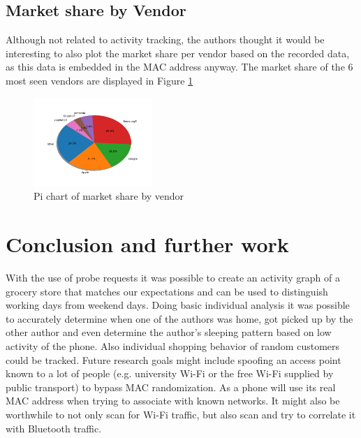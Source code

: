 \documentclass[conference,compsoc]{IEEEtran}
\begin{document}
\subsection{Market share by Vendor}
Although not related to activity tracking, the authors thought it would be interesting to also plot the market share per vendor based on the recorded data, as this data is embedded in the MAC address anyway. The market share of the 6 most seen vendors are displayed in Figure \ref{fig:piechart}

\begin{figure}[h!]
    \centering
    \includegraphics[width=0.4\textwidth]{img/piechard.png} 
    \caption{Pi chart of market share by vendor}
    \label{fig:piechart}
\end{figure}


\section{Conclusion and further work}
With the use of probe requests it was possible to create an activity graph of a grocery store that matches our expectations and can be used to distinguish working days from weekend days. Doing basic individual analysis it was possible to accurately determine when one of the authors was home, got picked up by the other author and even determine the author's sleeping pattern based on low activity of the phone. Also individual shopping behavior of random customers could be tracked.
Future research goals might include spoofing an access point known to a lot of people (e.g. university Wi-Fi or the free Wi-Fi supplied by public transport) to bypass MAC randomization. As a phone will use its real MAC address when trying to associate with known networks. It might also be worthwhile to not only scan for Wi-Fi traffic, but also scan and try to correlate it with Bluetooth traffic.





\end{document}
